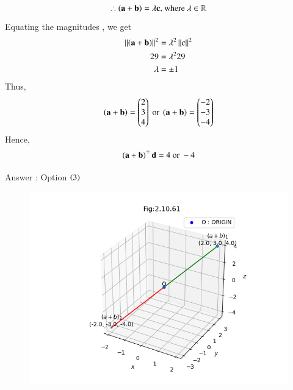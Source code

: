 \documentclass[journal]{IEEEtran}
\numberwithin{equation}{enumi}
\numberwithin{figure}{enumi}
\begin{document}
\begin{align}
   \therefore\left(\mathbf{a} + \mathbf{b}\right) = \lambda\mathbf{c}  \text{, where } \lambda \in \mathbb{R}
\end{align}
Equating the magnitudes , we get 
\begin{align}
    \left\lVert\left(\mathbf{a} + \mathbf{b}\right)\right\rVert^2 &= \lambda^2 \left\lVert c\right\rVert^2 \\
    29 &= \lambda^2 29 \\ 
    \lambda &= \pm 1 
 \end{align}
Thus, 
\begin{align}
    \left(\mathbf{a} + \mathbf{b}\right) = \begin{pmatrix}2 \\ 3 \\ 4\end{pmatrix} \text{ or } \left(\mathbf{a} + \mathbf{b}\right) = \begin{pmatrix}-2 \\ -3 \\ -4\end{pmatrix}
\end{align}
Hence, 
\begin{align}
    \left(\mathbf{a} + \mathbf{b}\right)^{\top}\mathbf{d} = 4 \text{ or } -4
\end{align}

Answer : Option $\left(3\right)$

\begin{figure}[H]
    \centering
    \includegraphics[width=1\columnwidth]{figs/vector1.png}
    \caption*{}
    \label{fig:}
\end{figure}
\end{document}
